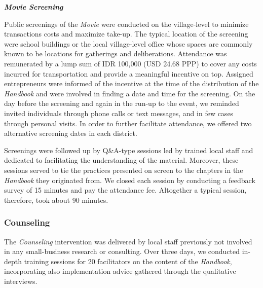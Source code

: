 \documentclass[11.5pt]{article}
\begin{document}
\noindent \emph{\textbf{Movie Screening}}\

\noindent Public screenings of the \emph{Movie} were conducted on the village-level to minimize transactions costs and maximize take-up. The typical location of the screening were school buildings or the local village-level office whose spaces are commonly known to be locations for gatherings and deliberations. Attendance was remunerated by a lump sum of IDR 100,000 (USD 24.68 PPP) to cover any costs incurred for transportation and provide a meaningful incentive on top. Assigned entrepreneurs were informed of the incentive at the time of the distribution of the \emph{Handbook} and were involved in finding a date and time for the screening. On the day before the screening and again in the run-up to the event, we reminded invited individuals through phone calls or text messages, and in few cases through personal visits. In order to further facilitate attendance, we offered two alternative screening dates in each district. 

Screenings were followed up by Q\&A-type sessions led by trained local staff and dedicated to facilitating the understanding of the material. Moreover, these sessions served to tie the practices presented on screen to the chapters in the \emph{Handbook} they originated from. We closed each session by conducting a feedback survey of 15 minutes and pay the attendance fee. Altogether a typical session, therefore, took about 90 minutes.

\subsubsection{Counseling}

The \emph{Counseling} intervention was delivered by local staff previously not involved in any small-business research or consulting. Over three days, we conducted in-depth training sessions for 20 facilitators on the content of the \emph{Handbook}, incorporating also implementation advice gathered through the qualitative interviews.
\end{document}
